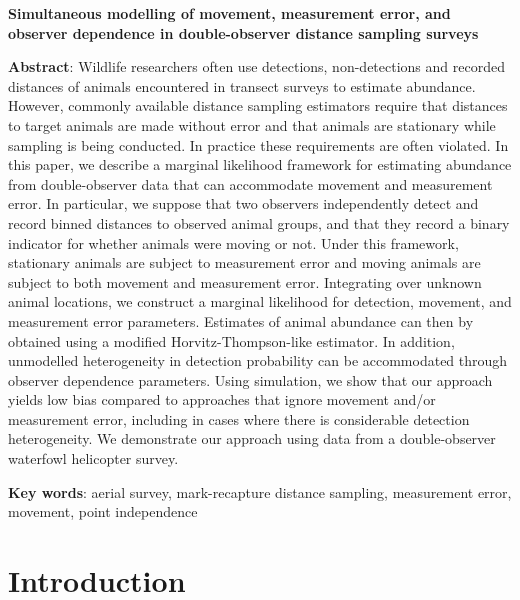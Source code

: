 \documentclass[12pt,fleqn]{article}
\begin{document}
\doublespacing

\textbf{Simultaneous modelling of movement, measurement error, and observer dependence in double-observer distance sampling surveys}

\linenumbers

\bigskip

\textbf{Abstract}: Wildlife researchers often use detections, non-detections and recorded distances of animals encountered in transect surveys to estimate abundance. However, commonly available distance sampling estimators require that distances to target animals are made without error and that animals are stationary while sampling is being conducted.  In practice these requirements are often violated. In this paper, we describe a marginal likelihood framework for estimating abundance from double-observer data that can accommodate movement and measurement error.  In particular, we suppose that two observers independently detect and record binned distances to observed animal groups, and that they record a binary indicator for whether animals were moving or not.  Under this framework, stationary animals are subject to measurement error and moving animals are subject to both movement and measurement error.  Integrating over unknown animal locations, we construct a marginal likelihood for detection, movement, and measurement error parameters. Estimates of animal abundance can then by obtained using a modified Horvitz-Thompson-like estimator.  In addition, unmodelled heterogeneity in detection probability can be accommodated through observer dependence parameters.  Using simulation, we show that our approach yields low bias compared to approaches that ignore movement and/or measurement error, including in cases where there is considerable detection heterogeneity.  We demonstrate our approach using data from a double-observer waterfowl helicopter survey.


\textbf{Key words}: aerial survey, mark-recapture distance sampling, measurement error, movement, point independence



\def\VAR{{\rm Var}\,}
\def\COV{{\rm Cov}\,}
\def\Prob{{\rm P}\,}
\def\bfX{\bf X}
\def\bfbeta{\boldsymbol{\beta}}
\def\bfdelta{\boldsymbol{\delta}}
\def\bfeta{\boldsymbol{\eta}}
\def\bfphi{\pmb{\phi}}
\def\bftheta{\pmb{\theta}}
\def\bfpsi{\pmb{\psi}}
\def\bfPsi{\pmb{\Psi}}
\def\bfpi{\pmb{\pi}}
\def\bfp{{\bf p}}
\def\bfGamma{\pmb{\Gamma}}




\section{Introduction}
\end{document}
